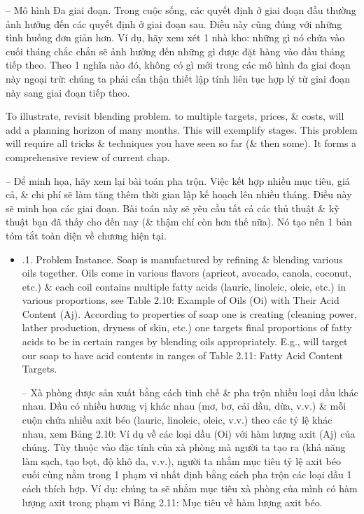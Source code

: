 \documentclass{article}
\begin{document}
\begin{itemize}
\begin{itemize}
        -- {\sf Mô hình Đa giai đoạn.} Trong cuộc sống, các quyết định ở giai đoạn đầu thường ảnh hưởng đến các quyết định ở giai đoạn sau. Điều này cũng đúng với những tình huống đơn giản hơn. Ví dụ, hãy xem xét 1 nhà kho: những gì nó chứa vào cuối tháng chắc chắn sẽ ảnh hưởng đến những gì được đặt hàng vào đầu tháng tiếp theo. Theo 1 nghĩa nào đó, không có gì mới trong các mô hình đa giai đoạn này ngoại trừ: chúng ta phải cẩn thận thiết lập tính liên tục hợp lý từ giai đoạn này sang giai đoạn tiếp theo.

        To illustrate, revisit blending problem. to multiple targets, prices, \& costs, will add a planning horizon of many months. This will exemplify stages. This problem will require all tricks \& techniques you have seen so far (\& then some). It forms a comprehensive review of current chap.

        -- Để minh họa, hãy xem lại bài toán pha trộn. Việc kết hợp nhiều mục tiêu, giá cả, \& chi phí sẽ làm tăng thêm thời gian lập kế hoạch lên nhiều tháng. Điều này sẽ minh họa các giai đoạn. Bài toán này sẽ yêu cầu tất cả các thủ thuật \& kỹ thuật bạn đã thấy cho đến nay (\& thậm chí còn hơn thế nữa). Nó tạo nên 1 bản tóm tắt toàn diện về chương hiện tại.
        \begin{itemize}
            \item {.1. Problem Instance.} Soap is manufactured by refining \& blending various oils together. Oils come in various flavors (apricot, avocado, canola, coconut, etc.) \& each coil contains multiple fatty acids (lauric, linoleic, oleic, etc.) in various proportions, see {\sf Table 2.10: Example of Oils (Oi) with Their Acid Content (Aj).} According to properties of soap one is creating (cleaning power, lather production, dryness of skin, etc.) one targets final proportions of fatty acids to be in certain ranges by blending oils appropriately. E.g., will target our soap to have acid contents in ranges of {\sf Table 2.11: Fatty Acid Content Targets}.

            -- Xà phòng được sản xuất bằng cách tinh chế \& pha trộn nhiều loại dầu khác nhau. Dầu có nhiều hương vị khác nhau (mơ, bơ, cải dầu, dừa, v.v.) \& mỗi cuộn chứa nhiều axit béo (lauric, linoleic, oleic, v.v.) theo các tỷ lệ khác nhau, xem {\sf Bảng 2.10: Ví dụ về các loại dầu (Oi) với hàm lượng axit (Aj) của chúng.} Tùy thuộc vào đặc tính của xà phòng mà người ta tạo ra (khả năng làm sạch, tạo bọt, độ khô da, v.v.), người ta nhắm mục tiêu tỷ lệ axit béo cuối cùng nằm trong 1 phạm vi nhất định bằng cách pha trộn các loại dầu 1 cách thích hợp. Ví dụ: chúng ta sẽ nhắm mục tiêu xà phòng của mình có hàm lượng axit trong phạm vi {\sf Bảng 2.11: Mục tiêu về hàm lượng axit béo}.


\end{itemize}
\end{itemize}
\end{itemize}
\end{document}
